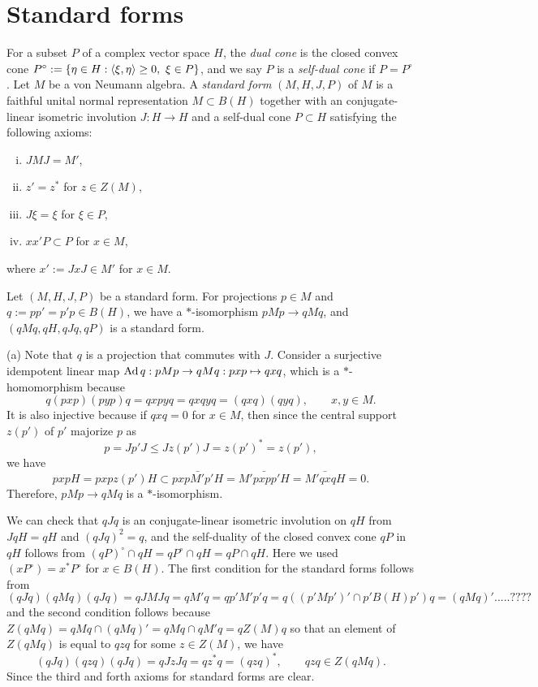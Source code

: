 \documentclass{../../large}
\begin{document}
\section{Standard forms}


\begin{prb}
For a subset $P$ of a complex vector space $H$, the \emph{dual cone} is the closed convex cone $P^\circ:=\{\eta\in H:\<\xi,\eta\>\ge0,\ \xi\in P\}$, and we say $P$ is a \emph{self-dual cone} if $P=P^\circ$.
Let $M$ be a von Neumann algebra.
A \emph{standard form} $(M,H,J,P)$ of $M$ is a faithful unital normal representation $M\subset B(H)$ together with an conjugate-linear isometric involution $J:H\to H$ and a self-dual cone $P\subset H$ satisfying the following axioms:
\begin{enumerate}[(i)]
\item $JMJ=M'$,
\item $z'=z^*$ for $z\in Z(M)$,
\item $J\xi=\xi$ for $\xi\in P$,
\item $xx'P\subset P$ for $x\in M$,
\end{enumerate}
where $x':=JxJ\in M'$ for $x\in M$.
\begin{parts}
\item Let $(M,H,J,P)$ be a standard form. For projections $p\in M$ and $q:=pp'=p'p\in B(H)$, we have a $*$-isomorphism $pMp\to qMq$, and $(qMq,qH,qJq,qP)$ is a standard form.
\end{parts}
\end{prb}
\begin{pf}
(a)
Note that $q$ is a projection that commutes with $J$.
Consider a surjective idempotent linear map $\operatorname{Ad} q:pMp\to qMq:pxp\mapsto qxq$, which is a $*$-homomorphism because
\[q(pxp)(pyp)q=qxpyq=qxqyq=(qxq)(qyq),\qquad x,y\in M.\]
It is also injective because if $qxq=0$ for $x\in M$, then since the central support $z(p')$ of $p'$ majorize $p$ as
\[p=Jp'J\le Jz(p')J=z(p')^*=z(p'),\]
we have
\[pxpH=pxpz(p')H\subset\bar{pxpM'p'H}=\bar{M'pxpp'H}=\bar{M'qxqH}=0.\]
Therefore, $pMp\to qMq$ is a $*$-isomorphism.

We can check that $qJq$ is an conjugate-linear isometric involution on $qH$ from $JqH=qH$ and $(qJq)^2=q$, and the self-duality of the closed convex cone $qP$ in $qH$ follows from $(qP)^\circ\cap qH=qP^\circ\cap qH=qP\cap qH$.
Here we used $(xP^\circ)=x^*P^\circ$ for $x\in B(H)$.
The first condition for the standard forms follows from
\[(qJq)(qMq)(qJq)=qJMJq=qM'q=qp'M'p'q=q((p'Mp')'\cap p'B(H)p')q=(qMq)'.....????\]
and the second condition follows because $Z(qMq)=qMq\cap(qMq)'=qMq\cap qM'q=qZ(M)q$ so that an element of $Z(qMq)$ is equal to $qzq$ for some $z\in Z(M)$, we have
\[(qJq)(qzq)(qJq)=qJzJq=qz^*q=(qzq)^*,\qquad qzq\in Z(qMq).\]
Since the third and forth axioms for standard forms are clear.
\end{pf}
\end{document}
